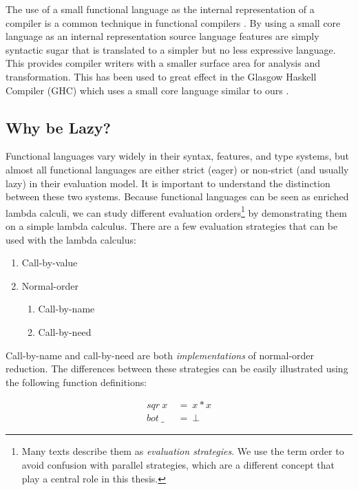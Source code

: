 The use of a small functional language as the internal representation of a
compiler is a common technique in functional compilers \citep{dutchBook,
PeytonJones:IFL, Augustsson:LazyMLCompiler, UHC}. By using a small core
language as an internal representation source language features are simply
syntactic sugar that is translated to a simpler but no less expressive
language. This provides compiler writers with a smaller surface area for
analysis and transformation. This has been used to great effect in the Glasgow
Haskell Compiler (GHC) which uses a small core language similar to ours
\citep{peyton2002secrets, jones1998transformation}. 

\subsection{Why be Lazy?}

Functional languages vary widely in their syntax, features, and type systems,
but almost all functional languages are either strict (eager) or non-strict
(and usually lazy) in their evaluation model. It is important to understand the
distinction between these two systems. Because functional languages can be
seen as enriched lambda calculi, we can study different evaluation
orders\footnote{Many texts describe them as \emph{evaluation strategies}.  We
use the term order to avoid confusion with parallel strategies, which are a
different concept that play a central role in this thesis.} by demonstrating
them on a simple lambda calculus. There are a few evaluation strategies that
can be used with the lambda calculus:

    \begin{enumerate}
        \item Call-by-value
        \item Normal-order
        \begin{enumerate}
            \item Call-by-name
            \item Call-by-need
        \end{enumerate}
    \end{enumerate}

Call-by-name and call-by-need are both \emph{implementations} of normal-order
reduction.  The differences between these strategies can be easily illustrated
using the following function definitions:

\begin{align*}
    sqr \ x \  &= \  x * x \\
    bot \ \_ \ &= \  \bot
\end{align*}

